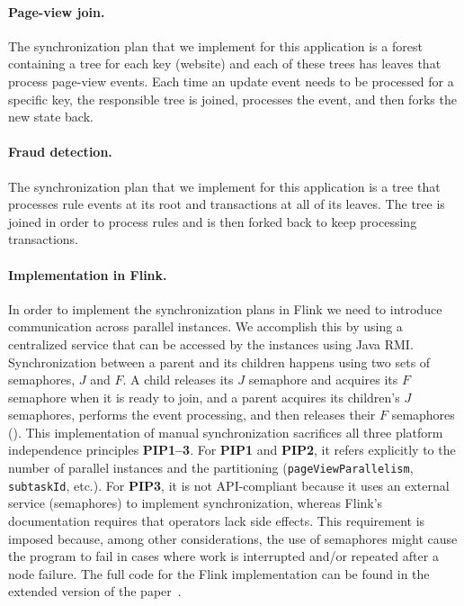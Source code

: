 \paragraph{Page-view join.}
The synchronization plan that we implement for this application is a forest containing a tree for each key (website) and each of these trees has leaves that process page-view events. Each time an update event needs to be processed for a specific key, the responsible tree is joined, processes the event, and then forks the new state back.

\paragraph{Fraud detection.}
The synchronization plan that we implement for this application is a tree that processes rule events at its root and transactions at all of its leaves. The tree is joined in order to process rules and is then forked back to keep processing transactions.

\paragraph{Implementation in Flink.}
In order to implement the synchronization plans in Flink we need to introduce communication across parallel instances. We accomplish this by using a centralized service that can be accessed by the instances using Java RMI. Synchronization between a parent and its children happens using two sets of semaphores, $J$ and $F$.
A child releases its $J$ semaphore and acquires its $F$ semaphore when it is ready to join, and a parent acquires its children's $J$ semaphores, performs the event processing, and then releases their $F$ semaphores ().
This implementation of manual synchronization
sacrifices all three platform independence principles \textbf{PIP1--3}.
For \textbf{PIP1} and \textbf{PIP2}, it refers explicitly to the number of parallel instances and the partitioning (\texttt{pageViewParallelism}, \texttt{subtaskId}, etc.).
For \textbf{PIP3}, it is not API-compliant because it uses an external service (semaphores) to implement synchronization, whereas Flink's documentation requires that operators lack side effects.
This requirement is imposed because, among other considerations, the use of semaphores might cause the program to fail in cases where
work is interrupted and/or repeated after a node failure.
The full code for the Flink implementation can be found in the extended version of the paper~.


